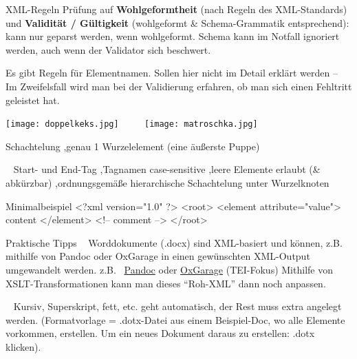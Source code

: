 \begin{frame}{XML-Regeln}
\footnotesize
Prüfung auf \textbf{Wohlgeformtheit} (nach Regeln des XML-Standards) und \textbf{Validität / Gültigkeit} (wohlgeformt \& Schema-Grammatik entsprechend): kann nur geparst werden, wenn wohlgeformt. Schema kann im Notfall ignoriert werden, auch wenn der Validator sich beschwert.

Es gibt Regeln für Elementnamen. Sollen hier nicht im Detail erklärt werden -- Im Zweifelsfall wird man bei der Validierung erfahren, ob man sich einen Fehltritt geleistet hat.

\texttt{[image: doppelkeks.jpg]}~ ~ ~~\texttt{[image: matroschka.jpg]}
\vspace{1em}


Schachtelung \sep genau 1 Wurzelelement (eine äußerste Puppe)


~ 
Start- und End-Tag \sep Tagnamen case-sensitive \sep leere Elemente erlaubt (\& abkürzbar) \sep ordnungsgemäße hierarchische Schachtelung unter Wurzelknoten

\end{frame}


\begin{mybiggerxml}{Minimalbeispiel}
<?xml version="1.0" ?>
<root>
<element attribute="value">
content
</element>
<!-- comment -->
</root>
\end{mybiggerxml}

\begin{frame}{Praktische Tipps}
\footnotesize
{}~ 
Worddokumente (.docx) sind XML-basiert und können, z.B. mithilfe von Pandoc oder OxGarage in einen gewünschten XML-Output umgewandelt werden.
 z.B.~ \href{https://pandoc.org/}{Pandoc} oder \href{http://oxgarage.tei-c.org/#}{OxGarage} (TEI-Fokus)
Mithilfe von XSLT-Transformationen kann man dieses ``Roh-XML'' dann noch anpassen. \\
\smallskip

~ 
Kursiv, Superskript, fett, etc. geht automatisch, der Rest muss extra angelegt werden. (Formatvorlage = .dotx-Datei aus einem Beispiel-Doc, wo alle Elemente vorkommen, erstellen. Um ein neues Dokument daraus zu erstellen: .dotx klicken). \\
\normalsize
\end{frame}



